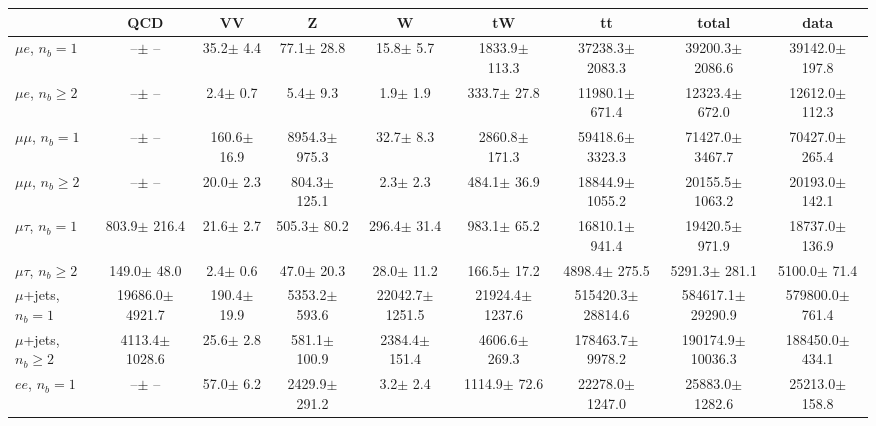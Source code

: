 \begin{sidewaystable}[p]
    \centering
    \setlength{\tabcolsep}{0.4em}
    \renewcommand{\arraystretch}{2}
    \small
    \begin{tabular}{l|cccccc|cc}
    \hline
        & QCD & VV  & Z & W & tW & tt & total & data      \\
    \hline
    
    $\mu e$, $n_b=1$                   &       --$\pm$     -- &     35.2$\pm$    4.4 &     77.1$\pm$   28.8 &     15.8$\pm$    5.7 &   1833.9$\pm$  113.3 &  37238.3$\pm$ 2083.3 &  39200.3$\pm$ 2086.6 &  39142.0$\pm$  197.8 \\ 
    $\mu e$, $n_b\geq2$                &       --$\pm$     -- &      2.4$\pm$    0.7 &      5.4$\pm$    9.3 &      1.9$\pm$    1.9 &    333.7$\pm$   27.8 &  11980.1$\pm$  671.4 &  12323.4$\pm$  672.0 &  12612.0$\pm$  112.3 \\ 
    \hline
    $\mu\mu$, $n_b=1$                  &       --$\pm$     -- &    160.6$\pm$   16.9 &   8954.3$\pm$  975.3 &     32.7$\pm$    8.3 &   2860.8$\pm$  171.3 &  59418.6$\pm$ 3323.3 &  71427.0$\pm$ 3467.7 &  70427.0$\pm$  265.4 \\ 
    $\mu\mu$, $n_b\geq2$               &       --$\pm$     -- &     20.0$\pm$    2.3 &    804.3$\pm$  125.1 &      2.3$\pm$    2.3 &    484.1$\pm$   36.9 &  18844.9$\pm$ 1055.2 &  20155.5$\pm$ 1063.2 &  20193.0$\pm$  142.1 \\ 
    \hline
    $\mu\tau$, $n_b=1$                 &    803.9$\pm$  216.4 &     21.6$\pm$    2.7 &    505.3$\pm$   80.2 &    296.4$\pm$   31.4 &    983.1$\pm$   65.2 &  16810.1$\pm$  941.4 &  19420.5$\pm$  971.9 &  18737.0$\pm$  136.9 \\ 
    $\mu\tau$, $n_b\geq2$              &    149.0$\pm$   48.0 &      2.4$\pm$    0.6 &     47.0$\pm$   20.3 &     28.0$\pm$   11.2 &    166.5$\pm$   17.2 &   4898.4$\pm$  275.5 &   5291.3$\pm$  281.1 &   5100.0$\pm$   71.4 \\ 
    \hline
    $\mu$+jets, $n_b=1$                &  19686.0$\pm$ 4921.7 &    190.4$\pm$   19.9 &   5353.2$\pm$  593.6 &  22042.7$\pm$ 1251.5 &  21924.4$\pm$ 1237.6 & 515420.3$\pm$28814.6 & 584617.1$\pm$29290.9 & 579800.0$\pm$  761.4 \\ 
    $\mu$+jets, $n_b\geq2$             &   4113.4$\pm$ 1028.6 &     25.6$\pm$    2.8 &    581.1$\pm$  100.9 &   2384.4$\pm$  151.4 &   4606.6$\pm$  269.3 & 178463.7$\pm$ 9978.2 & 190174.9$\pm$10036.3 & 188450.0$\pm$  434.1 \\ 
    \hline
    $e e$, $n_b=1$                     &       --$\pm$     -- &     57.0$\pm$    6.2 &   2429.9$\pm$  291.2 &      3.2$\pm$    2.4 &   1114.9$\pm$   72.6 &  22278.0$\pm$ 1247.0 &  25883.0$\pm$ 1282.6 &  25213.0$\pm$  158.8 \\ 

\end{tabular}
\end{sidewaystable}
